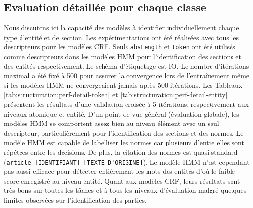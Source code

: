 \subsection{Evaluation détaillée pour chaque classe}
Nous discutons ici la capacité des modèles à identifier individuellement chaque type d'entité et de section. Les expérimentations ont été réalisées avec tous les descripteurs pour les modèles CRF. Seuls \verb|absLength| et \verb|token| ont été utilisés comme descripteurs dans les modèles HMM pour l'identification des sections et des entités respectivement. Le schéma d'étiquetage est IO. Le nombre d'itérations maximal a été fixé à 500 pour assurer la convergence lors de l'entraînement même si les modèles HMM ne convergeaient jamais après 500 itérations. Les Tableaux \ref{tab:structuration:perf-detail-token} et \ref{tab:structuration:perf-detail-entity} présentent les résultats d'une validation croisée à 5 itérations, respectivement aux niveaux atomique et entité. D'un point de vue général (évaluation globale), les modèles HMM se comportent assez bien au niveau élément avec un seul descripteur, particulièrement pour l'identification des sections et des normes. Le modèle HMM est capable de labelliser les normes car plusieurs d'entre elles sont répétées entre les décisions. De plus, la citation des normes est quasi standard (\verb|article [IDENTIFIANT] [TEXTE D'ORIGINE]|). Le modèle HMM n'est cependant pas aussi efficace pour détecter entièrement les mots des entités d'où le faible score enregistré au niveau entité. Quant aux modèles CRF, leurs résultats sont très bons sur toutes les tâches et à tous les niveaux d'évaluation malgré quelques limites observées sur l'identification des parties.
